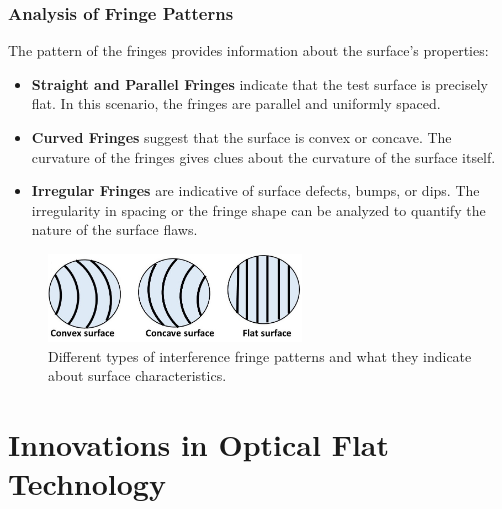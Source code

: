 \documentclass[../main.tex]{subfiles}
\begin{document}
\vspace{-10pt}

\subsubsection{Analysis of Fringe Patterns}
\vspace{-8pt}
The pattern of the fringes provides information about the surface's properties:
\vspace{-4pt}
\begin{itemize}
    \setlength{\itemsep}{0.1mm}
    \item \textbf{Straight and Parallel Fringes} indicate that the test surface is precisely flat. In this scenario, the fringes are parallel and uniformly spaced.
    \item \textbf{Curved Fringes} suggest that the surface is convex or concave. The curvature of the fringes gives clues about the curvature of the surface itself.
    \item \textbf{Irregular Fringes} are indicative of surface defects, bumps, or dips. The irregularity in spacing or the fringe shape can be analyzed to quantify the nature of the surface flaws.
\end{itemize}

\begin{figure}[H]
    \centering
    \includegraphics[width=0.6\textwidth]{Images/Introduction/fringe_types2}
    \vspace{-8pt}
    \caption{Different types of interference fringe patterns and what they indicate about surface characteristics.\cite{Joji_2023}}
    \label{fig:fringe-types}
\end{figure}

\section{Innovations in Optical Flat Technology}
\vspace{-15pt}
\end{document}

